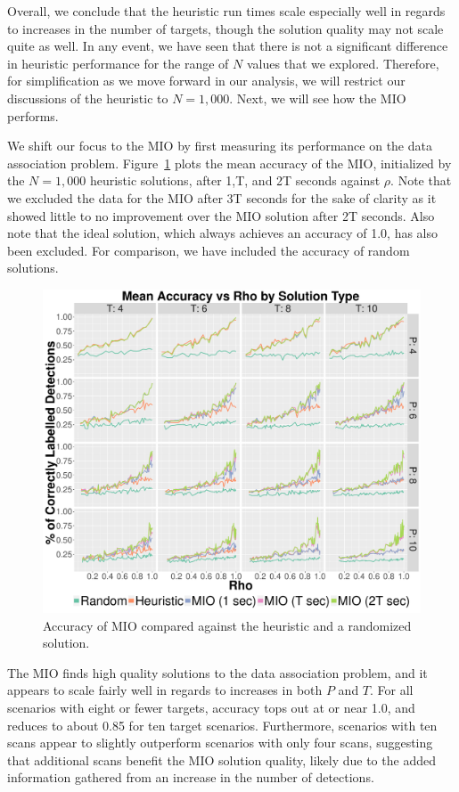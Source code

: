 Overall, we conclude that the heuristic run times scale especially well in regards to increases in the number of targets, though the solution quality may not scale quite as well. In any event, we have seen that there is not a significant difference in heuristic performance for the range of $N$ values that we explored. Therefore, for simplification as we move forward in our analysis, we will restrict our discussions of the heuristic to $N=1,000$. Next, we will see how the MIO performs. 

We shift our focus to the MIO by first measuring its performance on the data association problem. Figure~\ref{fig:Basic_Accuracy_Summary} plots the mean accuracy of the MIO, initialized by the $N=1,000$ heuristic solutions, after 1,T, and 2T seconds against $\rho$. Note that we excluded the data for the MIO after 3T seconds for the sake of clarity as it showed little to no improvement over the MIO solution after 2T seconds. Also note that the ideal solution, which always achieves an accuracy of 1.0, has also been excluded. For comparison, we have included the accuracy of random solutions. 
\begin{figure}[ht]
  \centering  
  \includegraphics[width=\columnwidth]{../Figures/Basic_Accuracy_Summary}
  \caption{Accuracy of MIO compared against the heuristic and a randomized solution.}
  \label{fig:Basic_Accuracy_Summary}
\end{figure}

The MIO finds high quality solutions to the data association problem, and it appears to scale fairly well in regards to increases in both $P$ and $T$. For all scenarios with eight or fewer targets, accuracy tops out at or near 1.0, and reduces to about 0.85 for ten target scenarios. Furthermore, scenarios with ten scans appear to slightly outperform scenarios with only four scans, suggesting that additional scans benefit the MIO solution quality, likely due to the added information gathered from an increase in the number of detections. 

